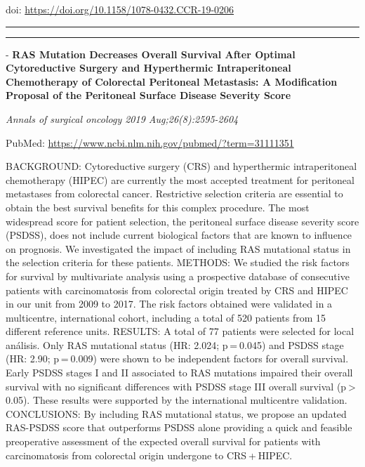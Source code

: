 \documentclass[]{article}
\begin{document}
doi: \url{https://doi.org/10.1158/1078-0432.CCR-19-0206}

{}

{}

\begin{center}\rule{0.5\linewidth}{\linethickness}\end{center}

\begin{center}\rule{0.5\linewidth}{\linethickness}\end{center}

 - \textbf{RAS Mutation Decreases Overall Survival After Optimal
Cytoreductive Surgery and Hyperthermic Intraperitoneal Chemotherapy of
Colorectal Peritoneal Metastasis: A Modification Proposal of the
Peritoneal Surface Disease Severity Score}

\emph{Annals of surgical oncology 2019 Aug;26(8):2595-2604}

PubMed: \url{https://www.ncbi.nlm.nih.gov/pubmed/?term=31111351}

BACKGROUND: Cytoreductive surgery (CRS) and hyperthermic intraperitoneal
chemotherapy (HIPEC) are currently the most accepted treatment for
peritoneal metastases from colorectal cancer. Restrictive selection
criteria are essential to obtain the best survival benefits for this
complex procedure. The most widespread score for patient selection, the
peritoneal surface disease severity score (PSDSS), does not include
current biological factors that are known to influence on prognosis. We
investigated the impact of including RAS mutational status in the
selection criteria for these patients. METHODS: We studied the risk
factors for survival by multivariate analysis using a prospective
database of consecutive patients with carcinomatosis from colorectal
origin treated by CRS and HIPEC in our unit from 2009 to 2017. The risk
factors obtained were validated in a multicentre, international cohort,
including a total of 520 patients from 15 different reference units.
RESULTS: A total of 77 patients were selected for local análisis. Only
RAS mutational status (HR: 2.024; p = 0.045) and PSDSS stage (HR: 2.90;
p = 0.009) were shown to be independent factors for overall survival.
Early PSDSS stages I and II associated to RAS mutations impaired their
overall survival with no significant differences with PSDSS stage III
overall survival (p \textgreater{} 0.05). These results were supported
by the international multicentre validation. CONCLUSIONS: By including
RAS mutational status, we propose an updated RAS-PSDSS score that
outperforms PSDSS alone providing a quick and feasible preoperative
assessment of the expected overall survival for patients with
carcinomatosis from colorectal origin undergone to CRS + HIPEC.
\end{document}
